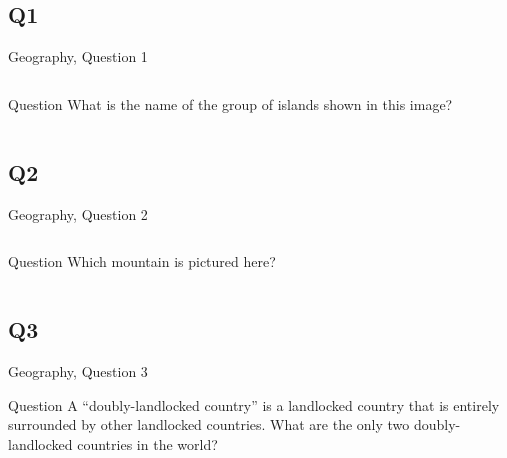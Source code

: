 \documentclass[11pt]{beamer}
\begin{document}
\subsection*{Q1}
\begin{frame}[t]{Geography, Question 1}
\begin{columns}[T,totalwidth=\linewidth]
\begin{column}{0.32\linewidth}
\begin{block}{Question}
What is the name of the group of islands shown in this image?
\end{block}
\end{column}
\begin{column}{0.65\linewidth}
\begin{center}
\texttt{[image: \{Images/galapagos]}.png}
\end{center}
\end{column}
\end{columns}
\end{frame}
\subsection*{Q2}
\begin{frame}[t]{Geography, Question 2}
\begin{columns}[T,totalwidth=\linewidth]
\begin{column}{0.32\linewidth}
\begin{block}{Question}
Which mountain is pictured here?
\end{block}
\end{column}
\begin{column}{0.65\linewidth}
\begin{center}
\texttt{[image: \{Images/materhorn]}.jpg}
\end{center}
\end{column}
\end{columns}
\end{frame}
\subsection*{Q3}
\begin{frame}[t]{Geography, Question 3}
\begin{block}{Question}
A ``doubly-landlocked country'' is a landlocked country that is entirely surrounded by other landlocked countries. What are the only two doubly-landlocked countries in the world?
\end{block}
\end{frame}
\end{document}
